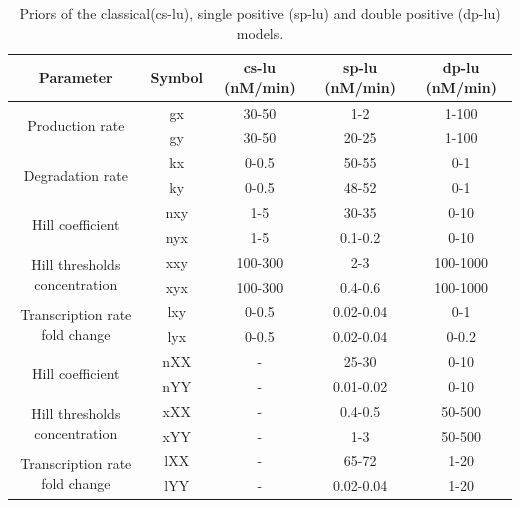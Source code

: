 \begin{table}[htpb]
\centering
\caption{Priors of the classical(\acrshort{cs-lu}), single positive (\acrshort{sp-lu}) and double positive (\acrshort{dp-lu}) models.}
\label{tab:lu_all}
\begin{tabular}{@{}ccccc@{}}
\toprule
Parameter                                            & Symbol & \acrshort{cs-lu} (nM/min)       & \acrshort{sp-lu} (nM/min)        & \acrshort{dp-lu} (nM/min)       \\ \midrule
\multirow{2}{*}{Production rate}                & gx        & 30-50   & 1-2       & 1-100    \\
                                                & gy        & 30-50   & 20-25     & 1-100    \\[4pt]
\multirow{2}{*}{Degradation rate}               & kx        & 0-0.5   & 50-55     & 0-1      \\
                                                & ky        & 0-0.5   & 48-52     & 0-1      \\[4pt]
\multirow{2}{*}{Hill coefficient}               & nxy       & 1-5     & 30-35     & 0-10     \\
                                                & nyx       & 1-5     & 0.1-0.2   & 0-10     \\[4pt]
\multirow{2}{*}{Hill thresholds concentration}  & xxy       & 100-300 & 2-3       & 100-1000 \\
                                                & xyx       & 100-300 & 0.4-0.6   & 100-1000 \\[4pt]
\multirow{2}{*}{Transcription rate fold change} & lxy       & 0-0.5   & 0.02-0.04 & 0-1      \\
                                                & lyx       & 0-0.5   & 0.02-0.04 & 0-0.2    \\[4pt]
\multirow{2}{*}{Hill coefficient}               & nXX       & -       & 25-30     & 0-10     \\
                                                & nYY       & -       & 0.01-0.02 & 0-10     \\[4pt]
\multirow{2}{*}{Hill thresholds concentration}  & xXX       & -       & 0.4-0.5   & 50-500   \\
                                                & xYY       & -       & 1-3       & 50-500   \\[4pt]
\multirow{2}{*}{Transcription rate fold change} & lXX       & -       & 65-72     & 1-20     \\
                                                & lYY       & -       & 0.02-0.04 & 1-20     \\ \hline
\end{tabular}
\end{table}



